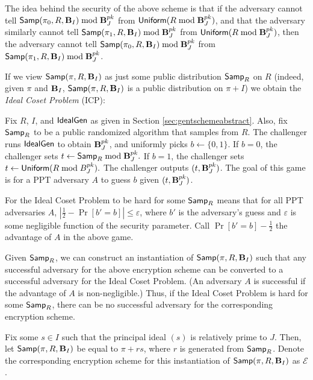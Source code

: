 The idea behind the security of the above scheme is that if the adversary cannot tell ${\sf Samp}(\pi_0, R, \textbf{B}_I) \bmod \textbf{B}_J^{pk}$ from ${\sf Uniform}(R \bmod \textbf{B}_J^{pk})$, and that the adversary similarly cannot tell  ${\sf Samp}(\pi_1, R, \textbf{B}_I) \bmod \textbf{B}_J^{pk}$ from ${\sf Uniform}(R \bmod \textbf{B}_J^{pk})$, then the adversary cannot tell ${\sf Samp}(\pi_0, R, \textbf{B}_I) \bmod \textbf{B}_J^{pk}$ from ${\sf Samp}(\pi_1, R, \textbf{B}_I) \bmod \textbf{B}_J^{pk}$.

If we view ${\sf Samp}(\pi, R, \textbf{B}_I)$ as just some public distribution ${\sf Samp}_R$ on $R$ (indeed, given $\pi$ and $\textbf{B}_I$, ${\sf Samp}(\pi, R, \textbf{B}_I)$ is a public distribution on $\pi + I$) we obtain the \emph{Ideal Coset Problem} (ICP):
\begin{definition}
Fix $R$, $I$, and ${\sf IdealGen}$ as given in Section \ref{sec:gentschemeabstract}. Also, fix ${\sf Samp}_R$ to be a public randomized algorithm that samples from $R$. The challenger runs ${\sf IdealGen}$ to obtain $\textbf{B}_J^{pk}$, and uniformly picks $b \leftarrow \{0, 1\}$. If $b = 0$, the challenger sets $t \leftarrow {\sf Samp}_R \bmod \textbf{B}_J^{pk}.$ If $b = 1$, the challenger sets $t \leftarrow {\sf Uniform}(R \bmod B_J^{pk}).$ The challenger outputs $(t, \textbf{B}_J^{pk})$. The goal of this game is for a PPT adversary $A$ to guess $b$ given $(t, \textbf{B}_J^{pk})$.
\end{definition}

For the Ideal Coset Problem to be hard for some ${\sf Samp}_R$ means that for all PPT adversaries $A$, $| \frac{1}{2} - \Pr[b' = b]| \leq \varepsilon$, where $b'$ is the adversary's guess and $\varepsilon$ is some negligible function of the security parameter. Call $\Pr[b' = b] - \frac{1}{2}$ the advantage of $A$ in the above game.

Given ${\sf Samp}_R$, we can construct an instantiation of ${\sf Samp}(\pi, R, \textbf{B}_I)$ such that any successful adversary for the above encryption scheme can be converted to a successful adversary for the Ideal Coset Problem. (An adversary $A$ is successful if the advantage of $A$ is non-negligible.) Thus, if the Ideal Coset Problem is hard for some ${\sf Samp}_R$, there can be no successful adversary for the corresponding encryption scheme.

Fix some $s \in I$ such that the principal ideal $(s)$ is relatively prime to $J$. Then, let ${\sf Samp}(\pi, R, \textbf{B}_I)$ be equal to $\pi + rs$, where $r$ is generated from ${\sf Samp}_R$. Denote the corresponding encryption scheme for this instantiation of ${\sf Samp}(\pi, R, \textbf{B}_I)$ as $\mathcal{E}$.

